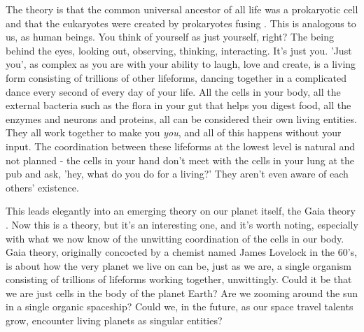 The theory is that the common universal ancestor of all life was a prokaryotic cell and that the eukaryotes were created by prokaryotes fusing \cite{ProcaEuka}.
This is analogous to us, as human beings. You think of yourself as just yourself, right? The being behind the eyes, looking out, observing, thinking, interacting.
It's just you.
'Just you', as complex as you are with your ability to laugh, love and create, is a living form consisting of trillions of other lifeforms, dancing together in a complicated dance every second of every day of your life.
All the cells in your body, all the external bacteria such as the flora in your gut that helps you digest food, all the enzymes and neurons and proteins, all can be considered their own living entities.
They all work together to make you \textit{you}, and all of this happens without your input.
The coordination between these lifeforms at the lowest level is natural and not planned - the cells in your hand don't meet with the cells in your lung at the pub and ask, 'hey, what do you do for a living?'
They aren't even aware of each others' existence.

This leads elegantly into an emerging theory on our planet itself, the Gaia theory \cite{Lovelock}.
Now this is a theory, but it's an interesting one, and it's worth noting, especially with what we now know of the unwitting coordination of the cells in our body.
Gaia theory, originally concocted by a chemist named James Lovelock in the 60's, is about how the very planet we live on can be, just as we are, a single organism consisting of trillions of lifeforms working together, unwittingly.
Could it be that we are just cells in the body of the planet Earth?
Are we zooming around the sun in a single organic spaceship?
Could we, in the future, as our space travel talents grow, encounter living planets as singular entities?